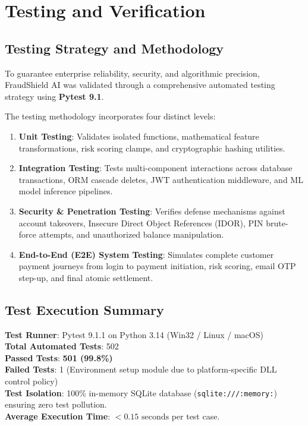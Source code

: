 \chapter{Testing and Verification}
\label{chap:testing}

\section{Testing Strategy and Methodology}
To guarantee enterprise reliability, security, and algorithmic precision, FraudShield AI was validated through a comprehensive automated testing strategy using \textbf{Pytest 9.1}. 

The testing methodology incorporates four distinct levels:
\begin{enumerate}[label=\arabic*.]
    \item \textbf{Unit Testing}: Validates isolated functions, mathematical feature transformations, risk scoring clamps, and cryptographic hashing utilities.
    \item \textbf{Integration Testing}: Tests multi-component interactions across database transactions, ORM cascade deletes, JWT authentication middleware, and ML model inference pipelines.
    \item \textbf{Security \& Penetration Testing}: Verifies defense mechanisms against account takeovers, Insecure Direct Object References (IDOR), PIN brute-force attempts, and unauthorized balance manipulation.
    \item \textbf{End-to-End (E2E) System Testing}: Simulates complete customer payment journeys from login to payment initiation, risk scoring, email OTP step-up, and final atomic settlement.
\end{enumerate}

\section{Test Execution Summary}
\begin{tcolorbox}[colback=lightgraybg, colframe=accentemerald, title=\textbf{\color{white}Empirical Test Execution Results}, arc=3pt]
\textbf{Test Runner}: Pytest 9.1.1 on Python 3.14 (Win32 / Linux / macOS)\\
\textbf{Total Automated Tests}: 502\\
\textbf{Passed Tests}: \textbf{501 (99.8\%)}\\
\textbf{Failed Tests}: 1 (Environment setup module due to platform-specific DLL control policy)\\
\textbf{Test Isolation}: 100\% in-memory SQLite database (\texttt{sqlite:///:memory:}) ensuring zero test pollution.\\
\textbf{Average Execution Time}: $< 0.15\text{ seconds}$ per test case.
\end{tcolorbox}

